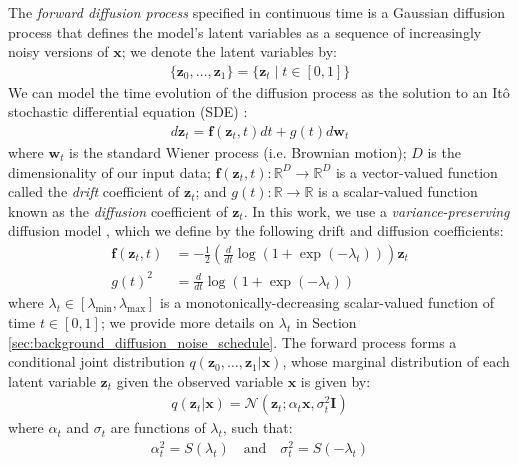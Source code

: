 \documentclass[ oneside,%
                    author={George Herbert},
                    degree={MSci},
                     title={Diffusion Models for Time-Evolving Precipitation Fields},
                  subtitle={}]{dissertation}
\begin{document}
The \textit{forward diffusion process} specified in continuous time is a Gaussian diffusion process that defines the model's latent variables as a sequence of increasingly noisy versions of $\mathbf{x}$; we denote the latent variables by:
\begin{align}
      \{\mathbf{z}_0,\ldots,\mathbf{z}_1\}=\{\mathbf{z}_t\mid t\in[0,1]\}
\end{align}
We can model the time evolution of the diffusion process as the solution to an It\^{o} stochastic differential equation (SDE) \cite{Score_Based_Song}:
\begin{align}
      d\mathbf{z}_t=\mathbf{f}(\mathbf{z}_t,t)dt + g(t)d\mathbf{w}_t\label{eq:forward_sde}
\end{align}
where $\mathbf{w}_t$ is the standard Wiener process (i.e. Brownian motion); $D$ is the dimensionality of our input data; $\mathbf{f}(\mathbf{z}_t, t):\mathbb{R}^D\to\mathbb{R}^D$ is a vector-valued function called the \textit{drift} coefficient of $\mathbf{z}_t$; and $g(t):\mathbb{R}\to\mathbb{R}$ is a scalar-valued function known as the \textit{diffusion} coefficient of $\mathbf{z}_t$. In this work, we use a \textit{variance-preserving} diffusion model \cite{DDPM_Ho}, which we define by the following drift and diffusion coefficients:
\begin{align}
      \mathbf{f}(\mathbf{z}_t,t)&=-\frac{1}{2}\left(\frac{d}{dt}\log\left(1+\exp(-\lambda_t)\right)\right)\mathbf{z}_t\\
      g(t)^2&=\frac{d}{dt}\log\left(1+\exp(-\lambda_t)\right)\label{eq:diffusion_coefficient_scalar}
\end{align}
where $\lambda_t\in[\lambda_{\min}, \lambda_{\max}]$ is a monotonically-decreasing scalar-valued function of time $t\in[0,1]$; we provide more details on $\lambda_t$ in Section \ref{sec:background_diffusion_noise_schedule}. The forward process forms a conditional joint distribution $q(\mathbf{z}_0,\ldots,\mathbf{z}_1|\mathbf{x})$, whose marginal distribution of each latent variable $\mathbf{z}_t$ given the observed variable $\mathbf{x}$ is given by:
\begin{align}
      q(\mathbf{z}_t|\mathbf{x})=\mathcal{N}\left(\mathbf{z}_t;\alpha_t\mathbf{x},\sigma_t^2\mathbf{I}\right)
      \label{eq:q_z_t_given_x}
\end{align}
where $\alpha_t$ and $\sigma_t$ are functions of $\lambda_t$, such that:
\begin{align}
      \alpha_t^2 = S(\lambda_t)\quad\text{and}\quad\sigma_t^2 = S(-\lambda_t)
\end{align}
\end{document}
